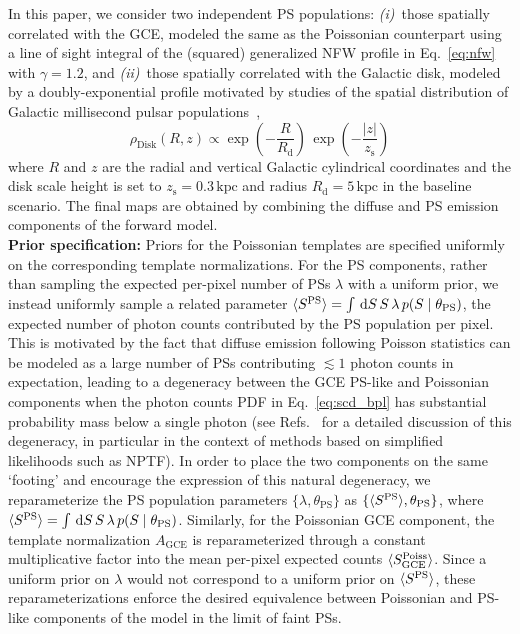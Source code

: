 \documentclass[prd,aps,10pt,nofootinbib,twocolumn,superscriptaddress,preprintnumbers,balancelastpage,longbibliography]{revtex4-1}
\begin{document}
In this paper, we consider two independent PS populations: \emph{(i)}~those spatially correlated with the GCE, modeled the same as the Poissonian counterpart using a line of sight integral of the (squared) generalized NFW profile in Eq.~\eqref{eq:nfw} with $\gamma = 1.2$, and \emph{(ii)}~those spatially correlated with the Galactic disk, modeled by a doubly-exponential profile motivated by studies of the spatial distribution of Galactic millisecond pulsar populations~\cite{Lorimer:2006qs, Bartels:2018xom},
\begin{equation}
\label{eq:disk_spatial}
\rho_\mathrm{Disk}(R, z) \propto \exp \left(-\frac{R}{R_\mathrm{d}}\right) \, \exp\left(-\frac{|z|}{z_\mathrm{s}}\right)
\end{equation}
where $R$ and $z$ are the radial and vertical Galactic cylindrical coordinates and the disk scale height is set to $z_\mathrm{s} = 0.3\,\mathrm{kpc}$ and radius $R_\mathrm{d} = 5\,\mathrm{kpc}$ in the baseline scenario. The final maps are obtained by combining the diffuse and PS emission components of the forward model. \\  %

\noindent
\textbf{Prior specification:} Priors for the Poissonian templates are specified uniformly on the corresponding template normalizations. For the PS components, rather than sampling the expected per-pixel number of PSs $\lambda$ with a uniform prior, we instead uniformly sample a related parameter $\langle S^{\rm PS} \rangle = \int\,\mathrm{d} S\,S\,\lambda \, p(S\mid\theta_\mathrm{PS})$, the expected number of photon counts contributed by the PS population per pixel. 
This is motivated by the fact that diffuse emission following Poisson statistics can be modeled as a large number of PSs contributing $\lesssim 1$ photon counts in expectation, leading to a degeneracy between the GCE PS-like and Poissonian components when the photon counts PDF in Eq.~\eqref{eq:scd_bpl} has substantial probability mass below a single photon (see Refs.~\cite{Chang:2019ars,Collin:2021ufc} for a detailed discussion of this degeneracy, in particular in the context of methods based on simplified likelihoods such as NPTF). In order to place the two components on the same `footing' and encourage the expression of this natural degeneracy, we reparameterize the PS population parameters $\{\lambda, \theta_\mathrm{PS}\}$ as $\{\langle S^{\rm PS} \rangle, \theta_\mathrm{PS}\}$, where $\langle S^{\rm PS} \rangle = \int\,\mathrm{d} S\,S\,\lambda \, p(S\mid\theta_\mathrm{PS})$. Similarly, for the Poissonian GCE component, the template normalization $A_\mathrm{GCE}$ is reparameterized through a constant multiplicative factor into the mean per-pixel expected counts $\langle S^{\rm Poiss}_\mathrm{GCE} \rangle$. Since a uniform prior on $\lambda$ would not correspond to a uniform prior on $\langle S^{\rm PS} \rangle$, these reparameterizations enforce the desired equivalence between Poissonian and PS-like components of the model in the limit of faint PSs.
\end{document}
